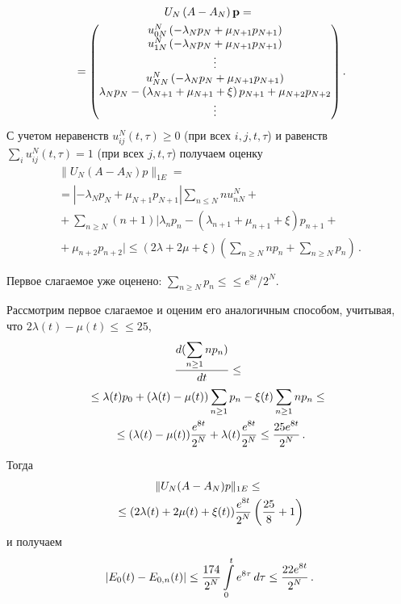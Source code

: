 \begin{multicols}{2}
\noindent
{\small
\begin{multline*}
U_N\left(A -A_N\right) {\mathbf p} ={}\\
{}=
\begin{pmatrix}
u_{0N}^N\left(-\lambda_Np_N +
\mu_{N+1}p_{N+1}\right)\\
u_{1N}^N\left(-\lambda_Np_N +
\mu_{N+1}p_{N+1}\right) \\ \vdots \\
u_{NN}^N\left(-\lambda_Np_N +
 \mu_{N+1}p_{N+1}\right) \\ \lambda_Np_N -\left(\lambda_{N+1} +
\mu_{N+1}+\xi\right)p_{N+1} + \mu_{N+2}p_{N+2} \\ \vdots
\end{pmatrix}.\hspace*{-0.75854pt}
\end{multline*}
}
С учетом неравенств $ u_{ij}^N (t,\tau) \ge 0$ (при всех $i,j,
t,\tau $) и равенств $\sum_i u_{ij}^N (t,\tau) = 1$ (при всех $j,
t,\tau $) получаем оценку
\begin{multline*}
\|U_N (A-A_N)p\|_{1E} ={}\\
{}=
|-\lambda_Np_N + \mu_{N+1}p_{N+1}|\sum_{n\leq N} n
u_{nN}^N +{}\\
{}+ \sum_{n \ge N} (n+1) | \lambda_n p_n
 - (\lambda_{n+1} + \mu_{n+1} + \xi)p_{n+1} +{}\\
 {}+
\mu_{n+2}p_{n+2} | \le %
(2\lambda + 2\mu + \xi)(\sum_{n \ge N}np_n +\sum_{n \ge N}p_n)\,.
\end{multline*}

Первое слагаемое уже оценено: $ \sum_{n \ge {N}}p_{n} \le$\linebreak $\le e^{8 t}/2^{N}$.

Рассмотрим первое слагаемое и оценим его аналогичным способом, учитывая, что $2\lambda(t)-\mu(t) \le$\linebreak $\le 25$,
\begin{multline*}
\displaystyle\frac{\displaystyle d(\sum\limits_{n \ge {1}}np_{n})\mathstrut}{\displaystyle dt\mathstrut}\le{}\\
\le \lambda(t) p_0 + (\lambda(t) - 
\mu(t))\sum\limits_{n \ge {1}}p_{n} -\xi(t) \sum\limits_{n \ge {1}}np_{n} \le{}\\
{}\le (\lambda(t) - \mu(t))\displaystyle\frac{\displaystyle e^{8 t}\mathstrut}{\displaystyle 2^{N}\mathstrut}+\lambda(t) \displaystyle\frac{\displaystyle e^{8 t}\mathstrut}{\displaystyle 2^{N}\mathstrut} \le \displaystyle\frac{\displaystyle 25 e^{8 t}\mathstrut}{\displaystyle 2^{N}\mathstrut}\,.
\end{multline*}
Тогда
\begin{multline*}
\|U_N (A-A_N)p\|_{1E}  \le{}\\
{}\le (2\lambda(t) + 2\mu(t)+ \xi(t))\displaystyle\frac{\displaystyle e^{8 t}\mathstrut}{\displaystyle 2^{N}\mathstrut}\left(\displaystyle\frac{\displaystyle 25\mathstrut}{\displaystyle 8\mathstrut}  + 1\right)
\end{multline*}
и получаем
\begin{equation*}
|E_0(t)- E_{0,n}(t)| \le \displaystyle\frac{\displaystyle 174\mathstrut}{\displaystyle 2^N\mathstrut} \int\limits_0^t e^{8 \tau}\, d\tau \le \displaystyle\frac{\displaystyle 22 e^{8 t}\mathstrut}{\displaystyle 2^{N}\mathstrut}\,.
\end{equation*}


\end{multicols}
